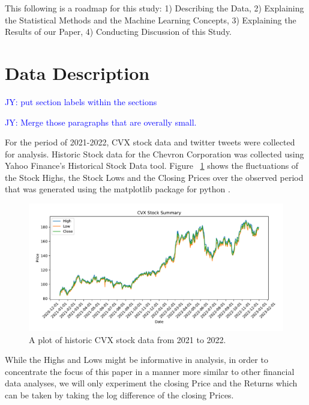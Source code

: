 \documentclass[12pt, letterpaper, titlepage]{article}
\newcommand{\jy}[1]{\textcolor{blue}{JY: #1}}
\begin{document}
This following is a roadmap for this study: 1) Describing the Data, 2) Explaining the Statistical Methods and the Machine Learning Concepts, 3) Explaining the Results of our Paper, 4) Conducting Discussion of this Study.



\section{Data Description} \jy{put section labels within the sections}
\label{sec: datadesc}

\jy{Merge those paragraphs that are overally small.}

For the period of 2021-2022,  CVX stock data and twitter tweets were collected for analysis.
Historic Stock data for the Chevron Corporation was collected using Yahoo Finance's Historical Stock Data tool. Figure ~\ref{fig:stockdata} shows the fluctuations of the Stock Highs, the Stock Lows and the Closing Prices over the observed period that was generated using the matplotlib package for python \citep{Hunter_2007}. 

\begin{figure}[tbp]
  \begin{center}
  \includegraphics[width=\textwidth]{../figures/fig1.pdf}
  \caption{A plot of historic CVX stock data from 2021 to 2022.}\label{fig:stockdata}
  \end{center}
\end{figure}


While the Highs and Lows might be informative in analysis, in order to concentrate the focus of this paper in a manner more similar to other financial data analyses, we will only experiment the closing Price and the Returns which can be taken by taking the log difference of the closing Prices. 	
\end{document}
